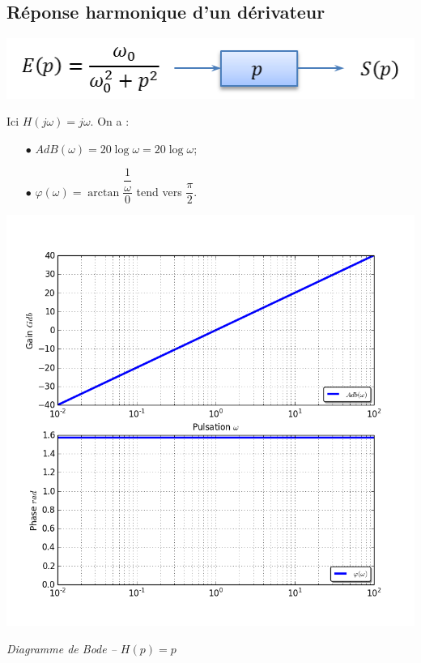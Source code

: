 \documentclass[10pt,oneside]{article}
\begin{document}
\subsection{Réponse harmonique d'un dérivateur}
\begin{minipage}[c]{.48\linewidth}
\begin{center}
\includegraphics[width=.9\textwidth]{png/derivateur_bloc}
\end{center}

Ici $H(j\omega)= j\omega$. On a :
\begin{itemize}
\item [$\bullet$] $AdB(\omega)=20 \log {\omega}=20\log \omega$;
\item [$\bullet$] $\varphi(\omega)= \arctan \dfrac{\dfrac{1}{\omega}}{0}$ tend vers $\dfrac{\pi}{2}$.
\end{itemize}

\end{minipage}\hfill
\begin{minipage}[c]{.48\linewidth}
\begin{center}
\includegraphics[width=.9\textwidth]{png/derivateur_bode}

\textit{Diagramme de Bode -- $H(p)=p$}
\end{center}
\end{minipage}
\end{document}
